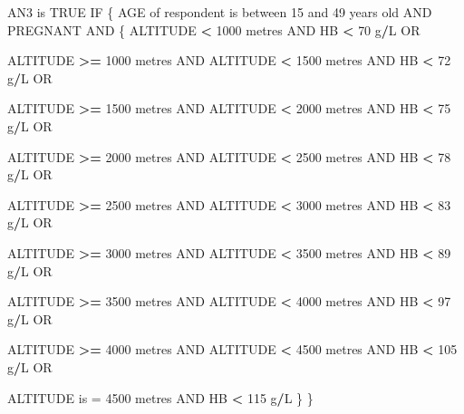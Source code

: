 \documentclass[12pt,a4paper]{article}
\newenvironment{Shaded}{\begin{snugshade}}{\end{snugshade}}
\newcommand{\DecValTok}[1]{\textcolor[rgb]{0.00,0.00,0.81}{#1}}
\newcommand{\NormalTok}[1]{#1}
\newcommand{\OperatorTok}[1]{\textcolor[rgb]{0.81,0.36,0.00}{\textbf{#1}}}
\newcommand{\OtherTok}[1]{\textcolor[rgb]{0.56,0.35,0.01}{#1}}
\newcommand{\StringTok}[1]{\textcolor[rgb]{0.31,0.60,0.02}{#1}}
\begin{document}
\begin{Shaded}
\begin{Highlighting}[]
\NormalTok{AN3 is }\OtherTok{TRUE}\NormalTok{ IF}
\NormalTok{  \{}
\NormalTok{    AGE of respondent is between }\DecValTok{15}\NormalTok{ and }\DecValTok{49}\NormalTok{ years old AND PREGNANT AND}
\NormalTok{      \{}
\NormalTok{        ALTITUDE }\OperatorTok{<}\StringTok{ }\DecValTok{1000}\NormalTok{ metres AND HB }\OperatorTok{<}\StringTok{ }\DecValTok{70}\NormalTok{ g}\OperatorTok{/}\NormalTok{L OR}
     
\NormalTok{        ALTITUDE }\OperatorTok{>=}\StringTok{ }\DecValTok{1000}\NormalTok{ metres AND ALTITUDE }\OperatorTok{<}\StringTok{ }\DecValTok{1500}\NormalTok{ metres AND HB }\OperatorTok{<}\StringTok{ }\DecValTok{72}\NormalTok{ g}\OperatorTok{/}\NormalTok{L OR}
     
\NormalTok{        ALTITUDE }\OperatorTok{>=}\StringTok{ }\DecValTok{1500}\NormalTok{ metres AND ALTITUDE }\OperatorTok{<}\StringTok{ }\DecValTok{2000}\NormalTok{ metres AND HB }\OperatorTok{<}\StringTok{ }\DecValTok{75}\NormalTok{ g}\OperatorTok{/}\NormalTok{L OR}

\NormalTok{        ALTITUDE }\OperatorTok{>=}\StringTok{ }\DecValTok{2000}\NormalTok{ metres AND ALTITUDE }\OperatorTok{<}\StringTok{ }\DecValTok{2500}\NormalTok{ metres AND HB }\OperatorTok{<}\StringTok{ }\DecValTok{78}\NormalTok{ g}\OperatorTok{/}\NormalTok{L OR}

\NormalTok{        ALTITUDE }\OperatorTok{>=}\StringTok{ }\DecValTok{2500}\NormalTok{ metres AND ALTITUDE }\OperatorTok{<}\StringTok{ }\DecValTok{3000}\NormalTok{ metres AND HB }\OperatorTok{<}\StringTok{ }\DecValTok{83}\NormalTok{ g}\OperatorTok{/}\NormalTok{L OR}

\NormalTok{        ALTITUDE }\OperatorTok{>=}\StringTok{ }\DecValTok{3000}\NormalTok{ metres AND ALTITUDE }\OperatorTok{<}\StringTok{ }\DecValTok{3500}\NormalTok{ metres AND HB }\OperatorTok{<}\StringTok{ }\DecValTok{89}\NormalTok{ g}\OperatorTok{/}\NormalTok{L OR}

\NormalTok{        ALTITUDE }\OperatorTok{>=}\StringTok{ }\DecValTok{3500}\NormalTok{ metres AND ALTITUDE }\OperatorTok{<}\StringTok{ }\DecValTok{4000}\NormalTok{ metres AND HB }\OperatorTok{<}\StringTok{ }\DecValTok{97}\NormalTok{ g}\OperatorTok{/}\NormalTok{L OR}

\NormalTok{        ALTITUDE }\OperatorTok{>=}\StringTok{ }\DecValTok{4000}\NormalTok{ metres AND ALTITUDE }\OperatorTok{<}\StringTok{ }\DecValTok{4500}\NormalTok{ metres AND HB }\OperatorTok{<}\StringTok{ }\DecValTok{105}\NormalTok{ g}\OperatorTok{/}\NormalTok{L OR}

\NormalTok{        ALTITUDE is =}\StringTok{ }\DecValTok{4500}\NormalTok{ metres AND HB }\OperatorTok{<}\StringTok{ }\DecValTok{115}\NormalTok{ g}\OperatorTok{/}\NormalTok{L}
\NormalTok{      \}}
\NormalTok{  \}}
\end{Highlighting}
\end{Shaded}
\end{document}
